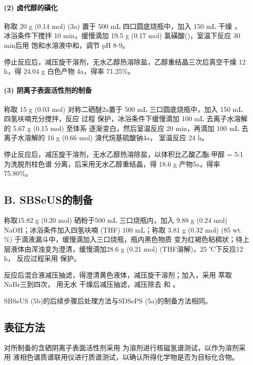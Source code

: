 \documentclass[bachelor,winfonts,replaceperiod]{jnuthesis}
\begin{document}
    \paragraph*{(2) 卤代醇的磺化}
    称取 20 g (0.14 mol)  (3a) 置于 500 mL 四口圆底烧瓶中，加入 150 mL 干燥 ，
    冰浴条件下搅拌 10 min，缓慢滴加 19.5 g (0.17 mol) 氯磺酸()，室温下反应 30 min后用
    饱和水溶液中和，调节 pH 8-9。
    
    停止反应后，减压旋干溶剂，无水乙醇热溶除盐，乙醇重结晶三次后真空干燥 12 h，得 24.04 g 白色产物
    4a，得率 71.25\%。
    
    \paragraph*{(3) 阴离子表面活性剂的制备}
    称取 15 g (0.03 mol) 对称二硒醚2a置于 500 mL 三口圆底烧瓶中，加入 150 mL 四氢呋喃充分搅拌，反应
    过程  保护，冰浴条件下缓慢滴加 100 mL 去离子水溶解的 5.67 g (0.15 mol) 至体系
    逐渐变白，然后室温反应 20 min，再滴加 100 mL 去离子水溶解的 16 g (0.66 mol) 溴代烷基硫酸钠4a，
    室温反应 24 h。
    
    停止反应后，减压旋干溶剂，无水乙醇热溶除盐，以体积比乙酸乙酯:甲醇 = 5:1 为洗脱剂柱色谱
    分离，后采用无水乙醇重结晶，得 18.6 g 产物5a，得率 75.80\%。
    \subsection*{B. SBSeUS的制备}
    称取15.82 g (0.20 mol) 硒粉于500 mL 三口烧瓶内，加入 9.88 g (0.24 mol) NaOH；冰浴条件加入四氢呋喃 (THF)
    100 mL；称取 3.81 g (0.32 mol)  (85 wt. \%) 于滴液漏斗中，缓慢滴加入三口烧瓶，瓶内黑色物质
    变为红褐色粘稠状；待上层液体由浑浊变为澄清，缓慢滴加28.6 g (0.21 mol)  (THF溶解)，25 ℃下反应12 h，
    反应过程采用  保护。
    
    反应后混合液减压抽滤，得澄清黄色液体，减压旋干溶剂；加入，采用  萃取 NaBr三到四次，
    用无水  干燥后减压抽滤，减压除去  和 。
    
    SBSeUS (5b)的后续步骤后处理方法与SDSePS (5a)的制备方法相同。
    
    \subsection{表征方法}
    对所制备的含硒阴离子表面活性剂采用 为溶剂进行核磁氢谱测试，以作为溶剂采用
    液相色谱质谱联用仪进行质谱测试，以确认所得化学物是否为目标化合物。
    
\end{document}
